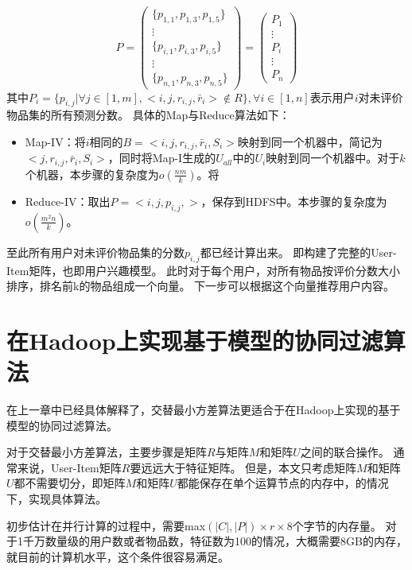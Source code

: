 \begin{equation}
P=\left(
\begin{array}{c}
 \{ p_{1,1},p_{1,3},p_{1,5} \} \\
\vdots \\
\{ p_{i,1},p_{i,3},p_{i,5} \} \\
\vdots \\
\{p_{n,1},p_{n,3},p_{n,5}\}
\end{array}
\right) = \left(
\begin{array}{c}
P_1 \\
\vdots\\
P_i\\
\vdots \\
P_n
\end{array}
\right)
\end{equation}
其中$P_i=\{p_{i,j}|\forall j\in [1,m],<i,j,r_{i,j},\bar{r}_i>\notin R\},\forall i\in[1,n]$表示用户$i$对未评价物品集的所有预测分数。
具体的Map与Reduce算法如下：
\begin{itemize}
\item Map-IV：将$i$相同的$B=<i,j,r_{i,j},\bar{r}_i ,S_i>$映射到同一个机器中，简记为$<j,r_{i,j},\bar{r}_i ,S_i>$，同时将Map-I生成的$U_{all}$中的$U_i$映射到同一个机器中。对于$k$个机器，本步骤的复杂度为$o(\frac{nm}{k})$。将
\item Reduce-IV：取出$P=<i,j,p_{i,j},>$，保存到HDFS中。本步骤的复杂度为$o(\frac{m^2n}{k})$。
\end{itemize}
至此所有用户对未评价物品集的分数$p_{i,j}$都已经计算出来。
即构建了完整的User-Item矩阵，也即用户兴趣模型。
此时对于每个用户，对所有物品按评价分数大小排序，排名前k的物品组成一个向量。
下一步可以根据这个向量推荐用户内容。

\section{在Hadoop上实现基于模型的协同过滤算法}
在上一章中已经具体解释了，交替最小方差算法更适合于在Hadoop上实现的基于模型的协同过滤算法。

对于交替最小方差算法，主要步骤是矩阵$R$与矩阵$M$和矩阵$U$之间的联合操作。
通常来说，User-Item矩阵$R$要远远大于特征矩阵。
但是，本文只考虑矩阵$M$和矩阵$U$都不需要切分，即矩阵$M$和矩阵$U$都能保存在单个运算节点的内存中，的情况下，实现具体算法。

初步估计在并行计算的过程中，需要max$(|C|,|P|)\times r \times 8$个字节的内存量。
对于1千万数量级的用户数或者物品数，特征数为100的情况，大概需要8GB的内存，就目前的计算机水平，这个条件很容易满足。

